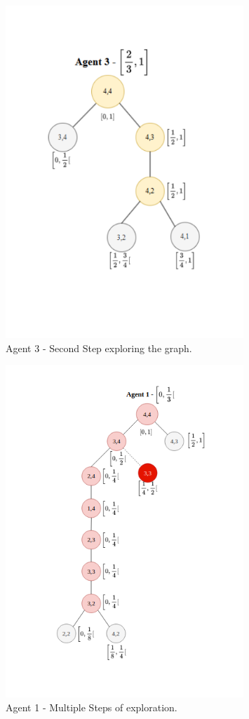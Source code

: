 \begin{figure}[H]
    \centering
    \includegraphics[width=0.8\textwidth]{ApeA/maze_agent_3_step_2.png}
    \caption{Agent 3 - Second Step exploring the graph.}
    \label{fig_agent_3_step_2}
\end{figure}

\begin{figure}[H]
    \centering
    \includegraphics[width=0.8\textwidth]{ApeA/maze_agent_1_step_3.png}
    \caption{Agent 1 - Multiple Steps of exploration.}
    \label{fig_agent_1_step_3}
\end{figure}

